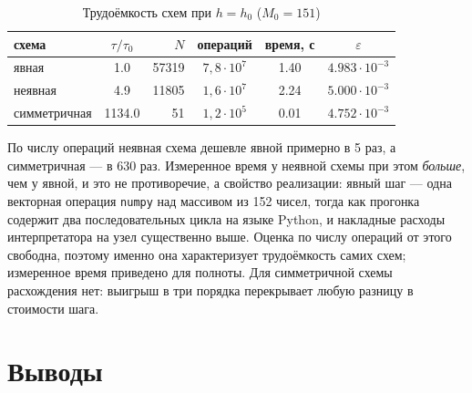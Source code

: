 \documentclass[12pt,a4paper]{article}
\begin{document}
\begin{table}[htbp]
\caption{Трудоёмкость схем при $h=h_0$ ($M_0=151$)}
\label{tab:cost}
\centering
\begin{tabular}{l c r c c c}
\toprule
схема & $\tau/\tau_0$ & $N$ & операций & время, с & $\varepsilon$\\
\midrule
явная & 1.0 & 57319 & $7{,}8\cdot10^{7}$ & 1.40 & $4.983\cdot10^{-3}$\\
неявная & 4.9 & 11805 & $1{,}6\cdot10^{7}$ & 2.24 & $5.000\cdot10^{-3}$\\
симметричная & 1134.0 & 51 & $1{,}2\cdot10^{5}$ & 0.01 & $4.752\cdot10^{-3}$\\
\bottomrule
\end{tabular}
\end{table}

По числу операций неявная схема дешевле явной примерно в 5 раз, а
симметричная --- в 630 раз. Измеренное время у неявной схемы при этом
\emph{больше}, чем у явной, и это не противоречие, а свойство
реализации: явный шаг --- одна векторная операция \texttt{numpy} над
массивом из 152 чисел, тогда как прогонка содержит два последовательных
цикла на языке Python, и накладные расходы интерпретатора на узел
существенно выше. Оценка по числу операций от этого свободна, поэтому
именно она характеризует трудоёмкость самих схем; измеренное время
приведено для полноты. Для симметричной схемы расхождения нет: выигрыш
в три порядка перекрывает любую разницу в стоимости шага.

\section{Выводы}
\end{document}
